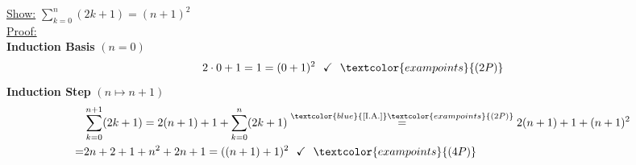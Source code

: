 {\color{solution}
\underline{Show:}
$\sum_{k=0}^{n}(2k+1) =(n+1)^2$\\
\underline{Proof:}\\
\textbf{Induction Basis } $(n=0)$
$$
2\cdot0+1=1=(0+1)^2~~\checkmark~~\textcolor{exampoints}{(2P)}
$$
\textbf{Induction Step} $(n \mapsto n+1)$
\begin{align*}
&\sum_{k=0}^{n+1}(2k+1)=2(n+1)+1+\sum_{k=0}^{n}(2k+1)\stackrel{\textcolor{blue}{\text{[I.A.]}}\textcolor{exampoints}{(2P)}}{=} 2(n+1)+1+(n+1)^2\\
=&2n+2+1+n^2+2n+1=((n+1)+1)^2~~\checkmark~~\textcolor{exampoints}{(4P)}
\end{align*}
}
